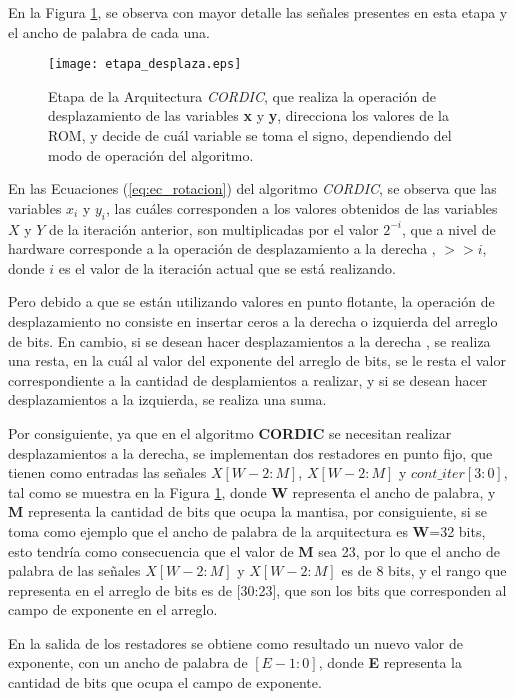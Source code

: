 En la Figura \ref{fig:etapa_desplaza}, se observa con mayor detalle las señales presentes en esta etapa y el ancho de palabra de cada una.

\begin{figure}[H]
  \centering
  \texttt{[image: etapa\_desplaza.eps]}
  \caption{Etapa de la Arquitectura \textit{CORDIC}, que realiza la operación de desplazamiento de las variables \textbf{x} y \textbf{y}, direcciona los valores de la ROM, y decide de cuál variable se toma el signo, dependiendo del modo de operación del algoritmo.}
  \label{fig:etapa_desplaza}
\end{figure}

En las Ecuaciones (\ref{eq:ec_rotacion}) del algoritmo \textit{CORDIC}, se observa que las variables $x_{i}$ y $y_{i}$, las cuáles corresponden a los valores obtenidos de las variables $X$ y $Y$ de la iteración anterior, son multiplicadas por el valor $2^{-i}$, que a nivel de hardware corresponde a la operación de desplazamiento a la derecha , $>>i$, donde $i$ es el valor de la iteración actual que se está realizando.

Pero debido a que se están utilizando valores en punto flotante, la operación de desplazamiento no consiste en insertar ceros a la derecha o izquierda del arreglo de bits. En cambio, si se desean hacer desplazamientos a la derecha , se realiza una resta, en la cuál al valor del exponente del arreglo de bits, se le resta el valor correspondiente a la cantidad de desplamientos a realizar, y si se desean hacer desplazamientos a la izquierda, se realiza una suma.

Por consiguiente, ya que en el algoritmo \textbf{CORDIC} se necesitan realizar desplazamientos a la derecha, se implementan dos restadores en punto fijo, que tienen como entradas las señales $X[W-2:M]$, $X[W-2:M]$ y $cont\_iter[3:0]$, tal como se muestra en la Figura \ref{fig:etapa_desplaza}, donde \textbf{W} representa el ancho de palabra, y \textbf{M} representa la cantidad de bits que ocupa la mantisa, por consiguiente, si se toma como ejemplo que el ancho de palabra de la arquitectura es \textbf{W}=32 bits, esto tendría como consecuencia que el valor de \textbf{M} sea 23, por lo que el ancho de palabra de las señales $X[W-2:M]$ y $X[W-2:M]$ es de 8 bits, y el rango que representa en el arreglo de bits es de [30:23], que son los bits que corresponden al campo de exponente en el arreglo.
 
En la salida de los restadores se obtiene como resultado un nuevo valor de exponente, con un ancho de palabra de $[E-1:0]$, donde \textbf{E} representa la cantidad de bits que ocupa el campo de exponente.

